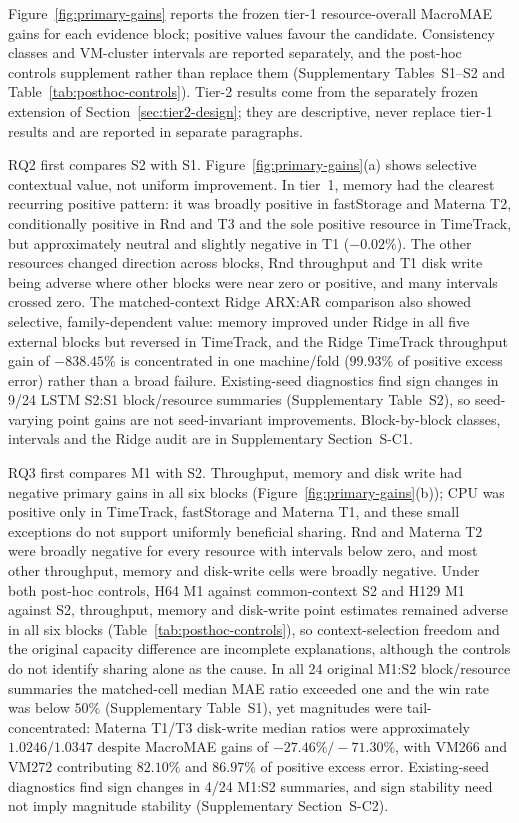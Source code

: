 Figure~\ref{fig:primary-gains} reports the frozen tier-1 resource-overall
MacroMAE gains for each evidence block; positive values favour the candidate.
Consistency classes and VM-cluster intervals are reported separately, and the
post-hoc controls supplement rather than replace them (Supplementary
Tables~S1--S2 and Table~\ref{tab:posthoc-controls}). Tier-2 results come from the
separately frozen extension of Section~\ref{sec:tier2-design}; they are
descriptive, never replace tier-1 results and are reported in separate
paragraphs.

RQ2 first compares S2 with S1. Figure~\ref{fig:primary-gains}(a) shows
selective contextual value, not uniform improvement. In tier~1, memory had the
clearest recurring positive pattern: it was broadly positive in fastStorage
and Materna T2, conditionally positive in Rnd and T3 and the sole positive
resource in TimeTrack, but approximately neutral and slightly negative in T1
($-0.02\%$). The other resources changed direction across blocks, Rnd
throughput and T1 disk write being adverse where other blocks were near zero
or positive, and many intervals crossed zero. The matched-context Ridge
ARX:AR comparison also showed selective, family-dependent value: memory
improved under Ridge in all five external blocks but reversed in TimeTrack,
and the Ridge TimeTrack throughput gain of $-838.45\%$ is concentrated in one
machine/fold ($99.93\%$ of positive excess error) rather than a broad
failure. Existing-seed diagnostics find sign changes in 9/24 LSTM S2:S1
block/resource summaries (Supplementary Table~S2), so seed-varying point gains
are not seed-invariant improvements. Block-by-block classes, intervals and the
Ridge audit are in Supplementary Section~S-C1.

RQ3 first compares M1 with S2. Throughput, memory and disk write had negative
primary gains in all six blocks (Figure~\ref{fig:primary-gains}(b)); CPU was
positive only in TimeTrack, fastStorage and Materna T1, and these small
exceptions do not support uniformly beneficial sharing. Rnd and Materna T2
were broadly negative for every resource with intervals below zero, and most
other throughput, memory and disk-write cells were broadly negative. Under
both post-hoc controls, H64 M1 against common-context S2 and H129 M1 against
S2, throughput, memory and disk-write point estimates remained adverse in all
six blocks (Table~\ref{tab:posthoc-controls}), so
context-selection freedom and the original capacity difference are
incomplete explanations, although the controls do not identify sharing alone
as the cause. In all 24 original M1:S2 block/resource summaries the
matched-cell median MAE ratio exceeded one and the win rate was below $50\%$
(Supplementary Table~S1), yet magnitudes were tail-concentrated: Materna T1/T3
disk-write median ratios were approximately $1.0246/1.0347$ despite MacroMAE
gains of $-27.46\%/-71.30\%$, with VM266 and VM272 contributing $82.10\%$ and
$86.97\%$ of positive excess error. Existing-seed diagnostics find sign
changes in 4/24 M1:S2 summaries, and sign stability need not imply magnitude
stability (Supplementary Section~S-C2).

